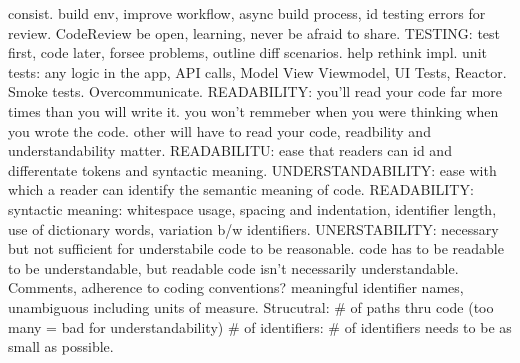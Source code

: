 \documentclass[10pt]{article}
\begin{document}
\begin{landscape}
\begin{multicols*}{6}
consist. build env, improve workflow, async build process, id testing errors for review. CodeReview be open, learning, never be afraid to share. TESTING: test first, code later, forsee problems, outline diff scenarios. help rethink impl. unit tests: any logic in the app, API calls, Model View Viewmodel, UI Tests, Reactor. Smoke tests. Overcommunicate. READABILITY: you'll read your code far more times than you will write it. you won't remmeber when you were thinking when you wrote the code. other will have to read your code, readbility and understandability matter. READABILITU: ease that readers can id and differentate tokens and syntactic meaning. UNDERSTANDABILITY: ease with which a reader can identify the semantic meaning of code. READABILITY: syntactic meaning: whitespace usage, spacing and indentation, identifier length, use of dictionary words, variation b/w identifiers. UNERSTABILITY: necessary but not sufficient for understabile code to be reasonable. code has to be readable to be understandable, but readable code isn't necessarily understandable. Comments, adherence to coding conventions? meaningful identifier names, unambiguous including units of measure. Strucutral: \# of paths thru code (too many = bad for understandability) \# of identifiers: \# of identifiers needs to be as small as possible.


\end{multicols*}
\end{landscape}
\end{document}
